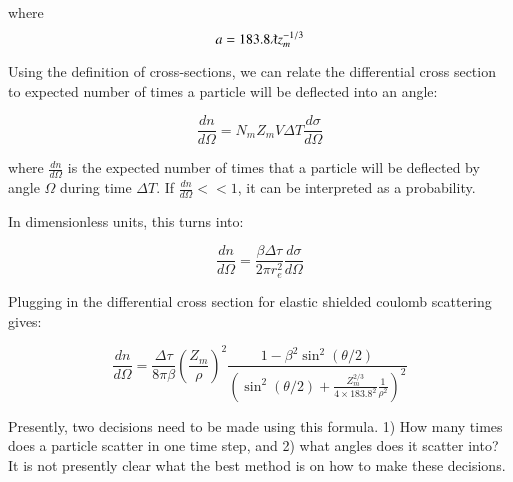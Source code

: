 \documentclass[]{article}
\begin{document}
where
\begin{equation} 
a=183.8 \lambdabar z_m^{-1/3}
\end{equation}

Using the definition of cross-sections, we can relate the differential cross section to expected number of times a particle will be deflected into an angle:

\begin{equation} 
\frac{dn}{d \Omega} =N_m Z_m V \Delta T \frac{d \sigma}{d \Omega}
\end{equation}

where $\frac{dn}{d \Omega}$ is the expected number of times that a particle will be deflected by angle $\Omega$ during time $\Delta T$. If $\frac{dn}{d \Omega} << 1$, it can be interpreted as a probability. 

In dimensionless units, this turns into:

\begin{equation} 
\frac{dn}{d \Omega} =\frac{ \beta \Delta \tau }{2 \pi r_e^2} \frac{d \sigma}{d \Omega}
\end{equation}

Plugging in the differential cross section for elastic shielded coulomb scattering gives:

\begin{equation} 
\frac{dn}{d \Omega} =\frac{ \Delta \tau }{8 \pi \beta }\left( \frac{Z_m}{\rho} \right)^2  \frac{1-\beta^2\sin^2(\theta/2)}{ \left(  \sin^2(\theta/2) + \frac{Z_m^{2/3}}{4\times 183.8^2} \frac{1}{\rho^2} \right)^2 }
\end{equation}

Presently, two decisions need to be made using this formula. 1) How many times does a particle scatter in one time step, and 2) what angles does it scatter into?  It is not presently clear what the best method is on how to make these decisions.
\end{document}
